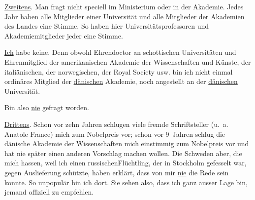 \pstart
           {\pb}\uline{Zweitens}. Man fragt nicht speciell im Ministerium oder in der Akademie. Jedes Jahr haben alle Mitglieder einer
                  \uline{Universität} und alle Mitglieder der \uline{Akademien} des Landes eine Stimme. So haben hier
               Universitätsprofessoren und Akademiemitglieder jeder eine Stimme.\pend
           
\pstart
           \uline{Ich} habe keine. Denn obwohl Ehrendoctor an schottischen Universitäten und Ehrenmitglied der
                  amerikanischen Akademie der Wissenschaften und
                  Künste, der italiänischen, der norwegischen, der Royal Society usw. bin
               ich nicht einmal ordinäres Mitglied der \uline{dänischen} Akademie, noch angestellt an der
                  \uline{dänischen} Universität.\pend
           
\pstart
           Bin also \uline{nie} gefragt worden.\pend
           
\pstart
           \uline{Drittens}. Schon vor zehn Jahren schlugen viele fremde
               Schriftsteller (u. a. Anatole France) mich zum
                  Nobelpreis vor; schon vor 9 Jahren schlug {\pb}die dänische Akademie der Wissenschaften mich einstimmig zum Nobelpreis vor und hat nie später einen anderen Vorschlag machen
               wollen. Die Schweden aber, die mich hassen,
               weil ich einen russischenFlüchtling, der in Stockholm gefesselt war, gegen Auslieferung
               schützte, haben erklärt, dass von mir \uline{nie} die Rede
               sein konnte. So unpopulär bin ich dort. Sie sehen also, dass ich ganz ausser Lage
               bin, jemand offiziell zu empfehlen.\pend
           
